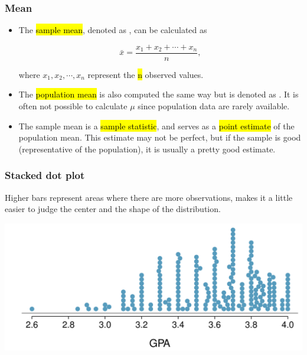 
\begin{frame}
\frametitle{Mean}

\begin{itemize}

\item The \hl{sample mean}, denoted as , can be calculated as

\[ \bar{x} = \frac{x_1 + x_2 + \cdots + x_n}{n}, \]

where $x_1, x_2, \cdots, x_n$ represent the \hl{n} observed values.

\item The \hl{population mean} is also computed the same way but is denoted as \mathhl{\mu}. It is often not possible to calculate $\mu$ since population data are rarely available.

\item The sample mean is a \hl{sample statistic}, and serves as a \hl{point estimate} of the population mean. This estimate may not be perfect, but if the sample is good (representative of the population), it is usually a pretty good estimate. 

\end{itemize}

\end{frame}


\begin{frame}
\frametitle{Stacked dot plot}

Higher bars represent areas where there are more observations, makes it a little easier to judge the center and the shape of the distribution.

\begin{center}
\includegraphics[width=\textwidth]{1-6_numerical_data/figures/gpa_dot_plot/gpa_dot_plot_stacked}
\end{center}

\end{frame}


